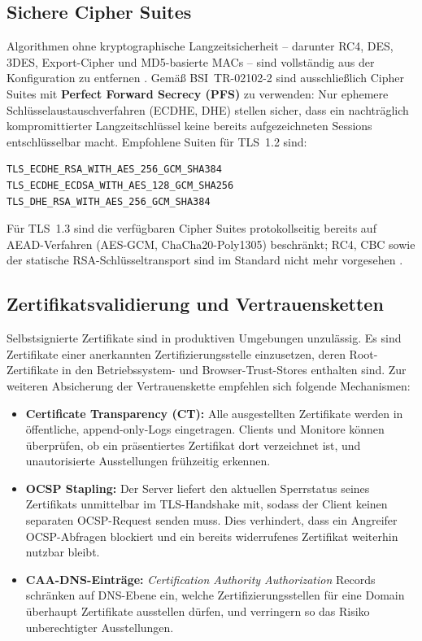 \subsection*{Sichere Cipher Suites}

Algorithmen ohne kryptographische Langzeitsicherheit -- darunter RC4, DES, 3DES, Export-Cipher und MD5-basierte MACs -- sind vollständig aus der Konfiguration zu entfernen \cite{bsi-tr02102}. Gemäß BSI~TR-02102-2 sind ausschließlich Cipher Suites mit \textbf{Perfect Forward Secrecy (PFS)} zu verwenden: Nur ephemere Schlüsselaustauschverfahren (ECDHE, DHE) stellen sicher, dass ein nachträglich kompromittierter Langzeitschlüssel keine bereits aufgezeichneten Sessions entschlüsselbar macht. Empfohlene Suiten für TLS~1.2 sind:

\begin{lstlisting}
TLS_ECDHE_RSA_WITH_AES_256_GCM_SHA384
TLS_ECDHE_ECDSA_WITH_AES_128_GCM_SHA256
TLS_DHE_RSA_WITH_AES_256_GCM_SHA384
\end{lstlisting}

Für TLS~1.3 sind die verfügbaren Cipher Suites protokollseitig bereits auf AEAD-Verfahren (AES-GCM, ChaCha20-Poly1305) beschränkt; RC4, CBC sowie der statische RSA-Schlüsseltransport sind im Standard nicht mehr vorgesehen \cite{windows-papst-ciphers}.

\subsection*{Zertifikatsvalidierung und Vertrauensketten}

Selbstsignierte Zertifikate sind in produktiven Umgebungen unzulässig. Es sind Zertifikate einer anerkannten Zertifizierungsstelle einzusetzen, deren Root-Zertifikate in den Betriebssystem- und Browser-Trust-Stores enthalten sind. Zur weiteren Absicherung der Vertrauenskette empfehlen sich folgende Mechanismen:

\begin{itemize}
  \item \textbf{Certificate Transparency (CT):} 
    Alle ausgestellten Zertifikate werden in öffentliche, append-only-Logs eingetragen. Clients und Monitore können überprüfen, ob ein präsentiertes Zertifikat dort verzeichnet ist, und unautorisierte Ausstellungen frühzeitig erkennen.
  \item \textbf{OCSP Stapling:} 
    Der Server liefert den aktuellen Sperrstatus seines Zertifikats unmittelbar im TLS-Handshake mit, sodass der Client keinen separaten OCSP-Request senden muss. Dies     verhindert, dass ein Angreifer OCSP-Abfragen blockiert und ein bereits widerrufenes Zertifikat weiterhin nutzbar bleibt.
  \item \textbf{CAA-DNS-Einträge:} 
    \emph{Certification Authority Authorization} Records schränken auf DNS-Ebene ein, welche Zertifizierungsstellen für eine Domain überhaupt Zertifikate ausstellen dürfen, und verringern so das Risiko unberechtigter Ausstellungen.
\end{itemize}

